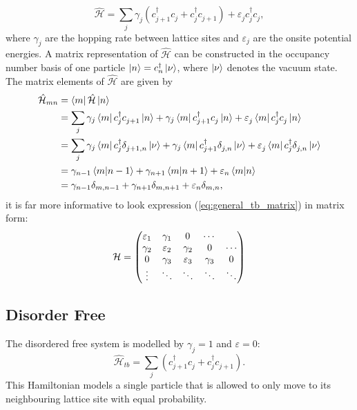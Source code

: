 \documentclass[12pt]{article}
\numberwithin{equation}{section}
\renewcommand{\H}{\mathcal{\hat{H}}}
\newcommand{\1}{\mathbb{1}}
\newcommand{\annihilation}{c^{}}
\newcommand{\creation}{c^{\dagger}}
\begin{document}
\section{}
\begin{equation}\label{eq:general_tb_model}
    \H=\sum_{j}\gamma^{}_j(\creation_{j+1}\annihilation_j+\creation_{j}\annihilation_{j+1})+\varepsilon^{}_j\creation_j\annihilation_j,
\end{equation}
where $\gamma_j$ are the hopping rate between lattice sites and $\varepsilon_j$ are the onsite potential energies. A matrix representation of $\H$ can be constructed in the occupancy number basis of one particle $\ket{n}=\creation_n\ket{\nu}$, where $\ket{\nu}$ denotes the vacuum state. The matrix elements of $\H$ are given by
\begin{align}
    \H_{mn}&=\bra{m}\H\ket{n}   
    \\
    &=\sum_j \gamma_j\bra{m}\creation_{j}\annihilation_{j+1}\ket{n} +\gamma_j\bra{m}\creation_{j+1}\annihilation_{j}\ket{n} + \varepsilon^{}_j\bra{m}\creation_{j}\annihilation_{j}\ket{n} 
    \\
    &= \sum_j \gamma_j\bra{m}\creation_{j}\delta^{}_{j+1,n}\ket{\nu}
    +\gamma_j\bra{m}\creation_{j+1}\delta^{}_{j,n}\ket{\nu} +
    \varepsilon^{}_j\bra{m}\creation_{j}\delta^{}_{j,n}\ket{\nu} 
    \\
    &= \gamma_{n-1}\bra{m}\ket{n-1}+\gamma_{n+1}\bra{m}\ket{n+1}+\varepsilon_n\bra{m}\ket{n}
    \\
    &=\gamma_{n-1}\delta_{m,n-1}+\gamma_{n+1}\delta_{m,n+1}+\varepsilon_n\delta_{m,n}, \label{eq:general_tb_matrix}
\end{align}
it is far more informative to look expression (\ref{eq:general_tb_matrix}) in matrix form:
\begin{equation}
\mathcal{H}=
    \mqty(
     \varepsilon_1 & \gamma_1 & 0_{}   &\cdots & 
    \\
     \gamma_2 &  \varepsilon_2 & \gamma_2 &0&\cdots
    \\
    0 &  \gamma_3 & \varepsilon_3 & \gamma_3  & 0 
    \\
    \vdots &  \ddots &\ddots &\ddots &\ddots )
\end{equation}
\subsection{Disorder Free}
The disordered free system is modelled by $\gamma_j=1$ and $\varepsilon=0$:
\begin{equation}
    \H_{tb}=\sum_{j}(\creation_{j+1}\annihilation_j+\creation_{j}\annihilation_{j+1}).
\end{equation}
This Hamiltonian models a single particle that is allowed to only move to its neighbouring lattice site with equal probability.
\end{document}
